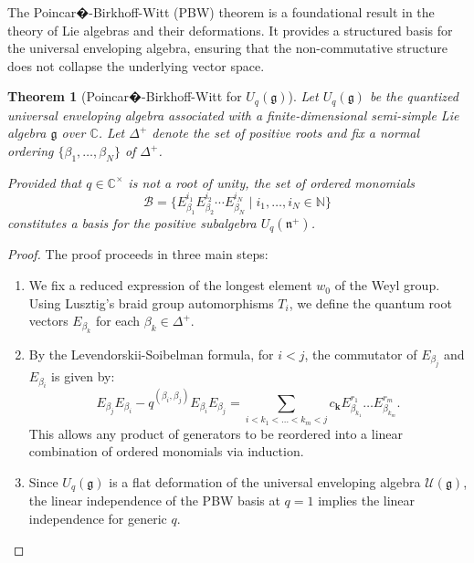 \documentclass[reqno,11pt]{amsart}
\theoremstyle{plain}
\newtheorem{theorem}{Theorem}[section]
\theoremstyle{definition}
\theoremstyle{remark}
\numberwithin{equation}{section}
\newcommand{\1}{\mathds{1}}
\newcommand{\2}{\frac{1}{2}}
\begin{document}
{				The Poincar�-Birkhoff-Witt (PBW) theorem is a foundational result in the theory of Lie algebras and their deformations. It provides a structured basis for the universal enveloping algebra, ensuring that the non-commutative structure does not collapse the underlying vector space.
				
				\begin{theorem}[Poincar�-Birkhoff-Witt for $U_q(\mathfrak{g})$]\label{pbw}
					Let $U_q(\mathfrak{g})$ be the quantized universal enveloping algebra associated with a finite-dimensional semi-simple Lie algebra $\mathfrak{g}$ over $\mathbb{C}$. Let $\Delta^+$ denote the set of positive roots and fix a normal ordering $\{\beta_1, \dots, \beta_N\}$ of $\Delta^+$. 
					
					Provided that $q \in \mathbb{C}^\times$ is not a root of unity, the set of ordered monomials
					\begin{equation}
						\mathcal{B} = \{ E_{\beta_1}^{i_1} E_{\beta_2}^{i_2} \cdots E_{\beta_N}^{i_N} \mid i_1, \dots, i_N \in \mathbb{N} \}
					\end{equation}
					constitutes a basis for the positive subalgebra $U_q(\mathfrak{n}^+)$.
				\end{theorem}
				\begin{proof}
					The proof proceeds in three main steps:
					\begin{enumerate}
						\item  We fix a reduced expression of the longest element $w_0$ of the Weyl group. Using Lusztig's braid group automorphisms $T_i$, we define the quantum root vectors $E_{\beta_k}$ for each $\beta_k \in \Delta^+$.
						\item  By the Levendorskii-Soibelman formula, for $i < j$, the commutator of $E_{\beta_j}$ and $E_{\beta_i}$ is given by:
						\begin{equation}
							E_{\beta_j} E_{\beta_i} - q^{(\beta_i, \beta_j)} E_{\beta_i} E_{\beta_j} = \sum_{i < k_1 < \dots < k_m < j} c_{\mathbf{k}} E_{\beta_{k_1}}^{r_1} \dots E_{\beta_{k_m}}^{r_m}.
						\end{equation}
						This allows any product of generators to be reordered into a linear combination of ordered monomials via induction.
						\item  Since $U_q(\mathfrak{g})$ is a flat deformation of the universal enveloping algebra $\mathcal{U}(\mathfrak{g})$, the linear independence of the PBW basis at $q=1$ implies the linear independence for generic $q$.
					\end{enumerate}
				\end{proof}
	
}
\end{document}
